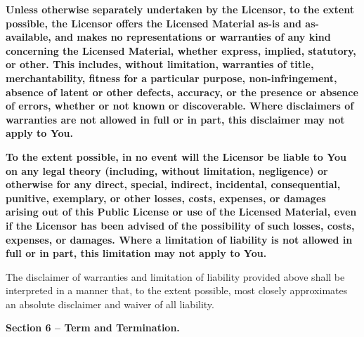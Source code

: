 	\begin{ccEnumerate}
		\item \textbf{Unless otherwise separately undertaken by the Licensor, to the extent possible, the Licensor offers the Licensed Material as-is and as-available, and makes no representations or warranties of any kind concerning the Licensed Material, whether express, implied, statutory, or other. This includes, without limitation, warranties of title, merchantability, fitness for a particular purpose, non-infringement, absence of latent or other defects, accuracy, or the presence or absence of errors, whether or not known or discoverable. Where disclaimers of warranties are not allowed in full or in part, this disclaimer may not apply to You.}
		\item \textbf{To the extent possible, in no event will the Licensor be liable to You on any legal theory (including, without limitation, negligence) or otherwise for any direct, special, indirect, incidental, consequential, punitive, exemplary, or other losses, costs, expenses, or damages arising out of this Public License or use of the Licensed Material, even if the Licensor has been advised of the possibility of such losses, costs, expenses, or damages. Where a limitation of liability is not allowed in full or in part, this limitation may not apply to You.}
	\end{ccEnumerate}
	\begin{ccEnumerate}
		\item The disclaimer of warranties and limitation of liability provided above shall be interpreted in a manner that, to the extent possible, most closely approximates an absolute disclaimer and waiver of all liability.
	\end{ccEnumerate}
	\par \textbf{Section 6 – Term and Termination.}
